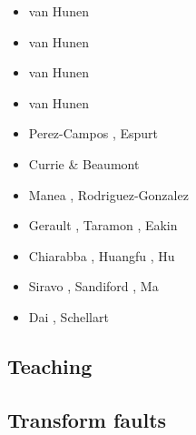 \begin{scriptsize}
\begin{itemize}
\item[\twothousand] van Hunen \etal \cite{vavv00}
\item[\twothousandone] van Hunen \etal \cite{vavv01}
\item[\twothousandtwo] van Hunen \etal \cite{vavv02,vavv02b}
\item[\twothousandfour] van Hunen \etal \cite{vavv04d}
\item[\twothousandeight] Perez-Campos \etal \cite{pekh08}, Espurt \etal \cite{esfm08}
\item[\twothousandeleven] Currie \& Beaumont \cite{cube11}
\item[\twothousandtwelve] Manea \etal \cite{mapm12}, Rodriguez-Gonzalez \etal \cite{ronb12}
\item[\twothousandfifteen] Gerault \etal \cite{gehm15}, Taramon \etal \cite{tarn15},
                           Eakin \etal \cite{ealw15}
\item[\twothousandsixteen] Chiarabba \etal \cite{chdf16}, Huangfu \etal \cite{huwc16}, Hu \etal \cite{hulh16}
\item[\twothousandnineteen] Siravo \etal \cite{sifg19}, Sandiford \etal \cite{sams19b},
                            Ma \etal \cite{malg19}
\item[\twothousandtwenty] Dai \etal \cite{dawl20}, Schellart \cite{sche20}
\end{itemize}
\end{scriptsize}

\subsection{Teaching} 

\begin{scriptsize}
\cite{grap11}
\cite{kerh14}
\cite{bemg19}
\end{scriptsize}


\subsection{Transform faults} 

